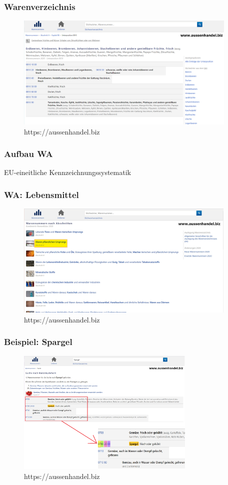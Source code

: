 \documentclass{beamer}
\begin{document}
\begin{frame}
\frametitle{Warenverzeichnis}
\begin{figure}[h]
    \centering
    \includegraphics[height=5.5cm]{warennummern}
    \caption{https://aussenhandel.biz}
  \end{figure}
\end{frame}

\begin{frame}
\frametitle{Aufbau WA}
EU-eineitliche Kennzeichnungssystematik
\end{frame}

\begin{frame}
\frametitle{WA: Lebensmittel}
  \begin{figure}[h]
    \centering
    \includegraphics[height=5.5cm]{wa}
    \caption{https://aussenhandel.biz}
  \end{figure}
\end{frame}

\begin{frame}
\frametitle{Beispiel: Spargel}
  \begin{figure}[h]
    \centering
    \includegraphics[height=6cm]{wa-spargel}
    \caption{https://aussenhandel.biz}
  \end{figure}
\end{frame}
\end{document}
